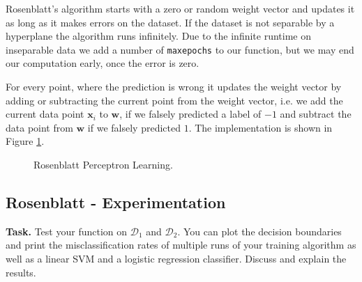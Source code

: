 \documentclass{support/acm_proc_article-sp}
\begin{document}
    Rosenblatt's algorithm starts with a zero or random weight vector and updates it as long as it makes errors on the dataset.
    If the dataset is not separable by a hyperplane the algorithm runs infinitely.
    Due to the infinite runtime on inseparable data we add a number of \lstinline{maxepochs} to our function, but we may end our computation
    early, once the error is zero.

    For every point, where the prediction is wrong it updates the weight vector by adding or subtracting the current point
    from the weight vector, i.e. we add the current data point $\mathbf{x}_i$ to $\mathbf{w}$, if we falsely predicted a label
    of $-1$ and subtract the data point from $\mathbf{w}$ if we falsely predicted $1$.
    The implementation is shown in Figure \ref{fig:rosenblatt}.
    \begin{figure}[!htbp]
        \centering
        \lstset{numbers=none,xleftmargin=0em}
        
        \caption{Rosenblatt Perceptron Learning.}
        \label{fig:rosenblatt}
    \end{figure}


    \subsection{Rosenblatt - Experimentation}

    \textbf{Task.} Test your function on $\mathcal{D}_1$ and $\mathcal{D}_2$.
    You can plot the decision boundaries and print the misclassification rates of multiple runs of your training algorithm
    as well as a linear SVM and a logistic regression classifier.
    Discuss and explain the results.
\end{document}
